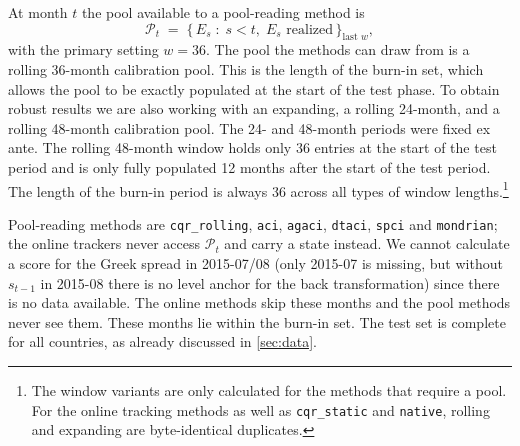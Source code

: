 At month $t$ the pool available to a pool-reading method is
\begin{equation}
  \mathcal{P}_t \;=\;
  \big\{\, E_s \;:\; s < t,\; E_s \text{ realized} \,\big\}_{\text{last } w},
  \label{eq:pool}
\end{equation}
with the primary setting $w = 36$. The pool the methods can draw from is a rolling 36-month calibration pool. This is the length of the burn-in set, which allows the pool to be exactly populated at the start of the test phase. To obtain robust results we are also working with an expanding, a rolling 24-month, and a rolling 48-month calibration pool. The 24- and 48-month periods were fixed ex ante. The rolling 48-month window holds only 36 entries at the start of the test period and is only fully populated 12 months after the start of the test period. The length of the burn-in period is always 36 across all types of window lengths.\footnote{The window variants are only calculated for the methods that require a pool. For the online tracking methods as well as \texttt{cqr\_static} and \texttt{native}, rolling and expanding are byte-identical duplicates.}


Pool-reading methods are \texttt{cqr\_rolling}, \texttt{aci}, \texttt{agaci},
\texttt{dtaci}, \texttt{spci} and \texttt{mondrian}; the online trackers never
access $\mathcal{P}_t$ and carry a state instead.
We cannot calculate a score for the Greek spread in 2015-07/08 (only 2015-07 is missing, but without $s_{t-1}$ in 2015-08 there is no level anchor for the back transformation) since there is no data available. The online methods skip these months and the pool methods never see them. These months lie within the burn-in set. The test set is complete for all countries, as already discussed in \cref{sec:data}.

